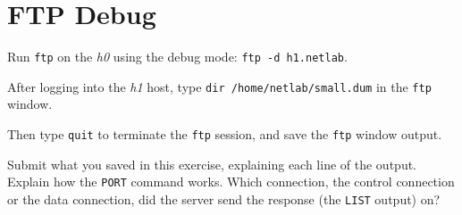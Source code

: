 \documentclass{../UTNetLab}
\begin{document}
\section{FTP Debug}
    Run \lstinline{ftp} on the \textit{h0} using the debug mode: \lstinline[emph={h0,h1,netlab}]{ftp -d h1.netlab}.

    After logging into the \textit{h1} host, type \lstinline{dir /home/netlab/small.dum} in the \lstinline{ftp} window.

    Then type \lstinline{quit} to terminate the \lstinline{ftp} session, and save the \lstinline{ftp} window output.
    
    \begin{report}
        \item Submit what you saved in this exercise, explaining each line of the output.
            Explain how the \lstinline{PORT} command works.
            Which connection, the control connection or the data connection, did the server send the response (the \lstinline{LIST} output) on?
    \end{report}
\end{document}
